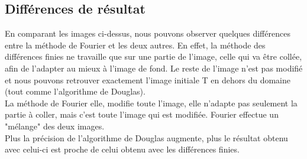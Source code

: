 \subsection{Différences de résultat}
En comparant les images ci-dessus, nous pouvons observer quelques différences entre la méthode de Fourier et les deux autres. En effet, la méthode des différences finies ne travaille que sur une partie de l'image, celle qui va être collée, afin de l'adapter au mieux à l'image de fond. Le reste de l'image n'est pas modifié et nous pouvons retrouver exactement l'image initiale T en dehors du domaine (tout comme l'algorithme de Douglas). \\
La méthode de Fourier elle, modifie toute l'image, elle n'adapte pas seulement la partie à coller, mais c'est toute l'image qui est modifiée. Fourier effectue un "mélange" des deux images. \\
Plus la précision de l'algorithme de Douglas augmente, plus le résultat obtenu avec celui-ci est proche de celui obtenu avec les différences finies.
